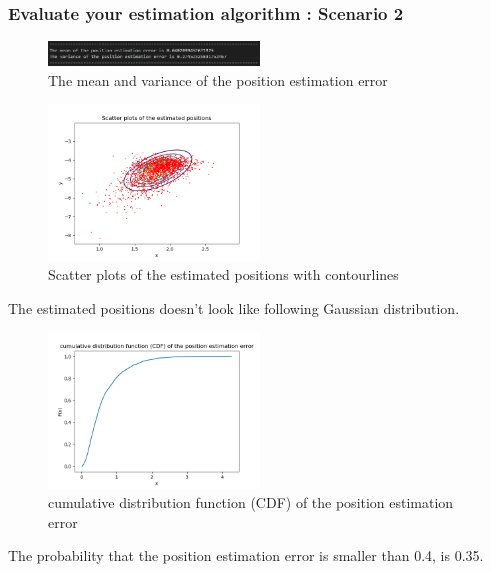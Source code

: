 \documentclass[a4paper]{article}
\begin{document}
\clearpage
\subsubsection{Evaluate your estimation algorithm : Scenario 2}
\begin{figure}[h]
	\begin{center}
		\includegraphics[width=0.5\textwidth]{mean_variance_error2.jpg}
		\caption{The mean and variance of the position estimation error}
	\end{center}
\end{figure}
\begin{figure}[h]
	\begin{center}
		\includegraphics[width=0.5\textwidth]{plotcon2.png}
		\caption{Scatter plots of the estimated positions with contourlines}
	\end{center}
\end{figure}
The estimated positions doesn't look like following Gaussian distribution.
\begin{figure}[h]
	\begin{center}		
		\includegraphics[width=0.5\textwidth]{CDF2.png}
		\caption{cumulative distribution function (CDF) of the position estimation error}
	\end{center}
\end{figure}

The probability that the position estimation error is smaller than 0.4, is 0.35.
\end{document}
